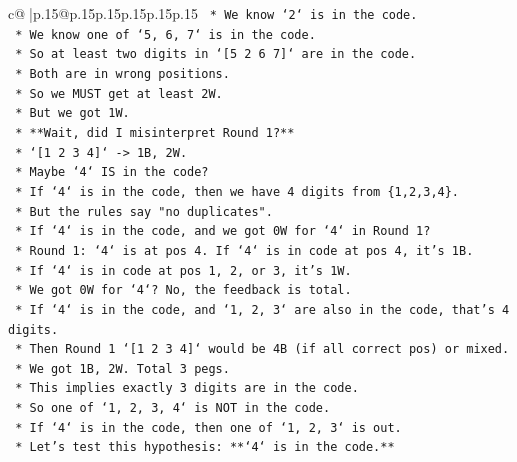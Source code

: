 \documentclass{article}
\begin{document}
{\begin{supertabular}{c@{$\;$}|p{.15\linewidth}@{}p{.15\linewidth}p{.15\linewidth}p{.15\linewidth}p{.15\linewidth}p{.15\linewidth}}
{{{\texttt{                        *   We know `2` is in the code.} \\
\texttt{                        *   We know one of `5, 6, 7` is in the code.} \\
\texttt{                        *   So at least two digits in `{[}5 2 6 7{]}` are in the code.} \\
\texttt{                        *   Both are in wrong positions.} \\
\texttt{                        *   So we MUST get at least 2W.} \\
\texttt{                        *   But we got 1W.} \\
\texttt{                    *   **Wait, did I misinterpret Round 1?**} \\
\texttt{                        *   `{[}1 2 3 4{]}` {-}> 1B, 2W.} \\
\texttt{                        *   Maybe `4` IS in the code?} \\
\texttt{                        *   If `4` is in the code, then we have 4 digits from \{1,2,3,4\}.} \\
\texttt{                        *   But the rules say "no duplicates".} \\
\texttt{                        *   If `4` is in the code, and we got 0W for `4` in Round 1?} \\
\texttt{                        *   Round 1: `4` is at pos 4. If `4` is in code at pos 4, it's 1B.} \\
\texttt{                        *   If `4` is in code at pos 1, 2, or 3, it's 1W.} \\
\texttt{                        *   We got 0W for `4`? No, the feedback is total.} \\
\texttt{                        *   If `4` is in the code, and `1, 2, 3` are also in the code, that's 4 digits.} \\
\texttt{                        *   Then Round 1 `{[}1 2 3 4{]}` would be 4B (if all correct pos) or mixed.} \\
\texttt{                        *   We got 1B, 2W. Total 3 pegs.} \\
\texttt{                        *   This implies exactly 3 digits are in the code.} \\
\texttt{                        *   So one of `1, 2, 3, 4` is NOT in the code.} \\
\texttt{                        *   If `4` is in the code, then one of `1, 2, 3` is out.} \\
\texttt{                        *   Let's test this hypothesis: **`4` is in the code.**} \\
}}}
\end{supertabular}}
\end{document}
